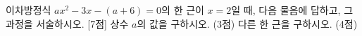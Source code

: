 이차방정식 $ax^2-3x-(a+6)=0$의 한 근이 $x=2$일 때, 다음 물음에 답하고, 그 과정을 서술하시오.  \mbox{[7점]}
 상수 $a$의 값을 구하시오. (3점)
 다른 한 근을 구하시오. (4점)
